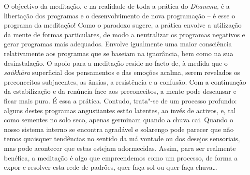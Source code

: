 O objectivo da meditação, e na realidade de toda a prática do \emph{Dhamma}, é a
libertação dos programas e o desenvolvimento de nova programação -- é esse o
programa da meditação! Como o paradoxo sugere, a prática envolve a utilização da
mente de formas particulares, de modo a neutralizar os programas negativos e
gerar programas mais adequados. Envolve igualmente uma maior consciência
relativamente aos programas que se baseiam na ignorância, bem como na sua
desinstalação. O apoio para a meditação reside no facto de, à medida que o
\emph{saṅkhāra} superficial dos pensamentos e das emoções acalma, serem
revelados os preconceitos subjacentes, as ânsias, a resistência e a confusão.
Com a continuação da estabilização e da renúncia face aos preconceitos, a mente
pode descansar e ficar mais pura. É essa a prática. Contudo, trata"-se de um
processo profundo: alguns destes programas angustiantes estão latentes, ao invés
de activos, e, tal como sementes no solo seco, apenas germinam quando a chuva
cai. Quando o nosso sistema interno se encontra agradável e solarengo pode
parecer que não temos quaisquer tendências no sentido da má vontade ou dos
desejos sensoriais, mas pode acontecer que estas estejam adormecidas. Assim,
para ser realmente benéfica, a meditação é algo que empreendemos como um
processo, de forma a expor e resolver esta rede de padrões, quer faça sol ou
quer faça chuva\ldots{}

